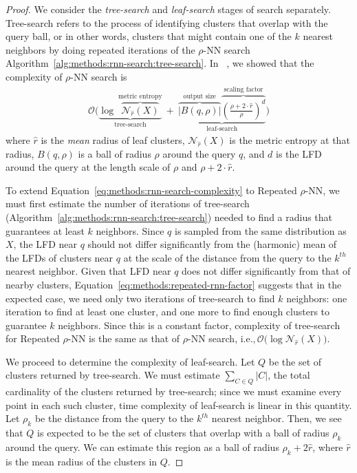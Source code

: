 \begin{proof} We consider the \textit{tree-search} and \textit{leaf-search} stages of search separately.
Tree-search refers to the process of identifying clusters that overlap with the query ball, or in other words, clusters that might contain one of the $k$ nearest neighbors by doing repeated iterations of the  $\rho$-NN search Algorithm~\ref{alg:methods:rnn-search:tree-search}.
In ~\cite{ishaq2019clustered}, we showed that the complexity of $\rho$-NN search is
\begin{gather}
    \mathcal{O}
    \Bigg(
        \underbrace{
            \log~\overbrace{\mathcal{N}_{\hat{r}}(X)}^{\textrm{metric entropy}}
        }_{\textrm{tree-search}}
        \ + \
        \underbrace{
            \overbrace{ \big| B(q, \rho) \big|}^{\textrm{output size}}
            \overbrace{ \left( \frac{\rho + 2 \cdot \hat{r}}{ \rho} \right) ^ d}^{\textrm{scaling factor}}
        }_{\textrm{leaf-search}}
    \Bigg)
    \label{eq:methods:rnn-search-complexity}
\end{gather}
where $\hat{r}$ is the \textit{mean} radius of leaf clusters, $\mathcal{N}_{\hat{r}}(X)$ is the metric entropy at that radius, $B(q, \rho)$ is a ball of radius $\rho$ around the query $q$, and $d$ is the LFD around the query at the length scale of $\rho$ and $\rho + 2 \cdot \hat{r}$.


To extend Equation~\ref{eq:methods:rnn-search-complexity} to Repeated $\rho$-NN, we must first estimate the number of iterations of tree-search (Algorithm~\ref{alg:methods:rnn-search:tree-search}) needed to find a radius that guarantees at least $k$ neighbors.
Since $q$ is sampled from the same distribution as $X$, the LFD near $q$ should not differ significantly from the (harmonic) mean of the LFDs of clusters near $q$ at the scale of the distance from the query to the $k^{th}$ nearest neighbor.
Given that LFD near $q$ does not differ significantly from that of nearby clusters, Equation~\ref{eq:methods:repeated-rnn-factor} suggests that in the expected case, we need only two iterations of tree-search to find $k$ neighbors:
one iteration to find at least one cluster, and one more to find enough clusters to guarantee $k$ neighbors.
Since this is a constant factor, complexity of tree-search for Repeated $\rho$-NN is the same as that of $\rho$-NN search, i.e.,\,$\mathcal{O}\big(\log\mathcal{N}_{\hat{r}}(X)\big)$.


We proceed to determine the complexity of leaf-search. Let $Q$ be the set of clusters returned by tree-search. We must estimate $\sum_{C \in Q} |C|$, the total cardinality of the clusters returned by tree-search; since we must examine every point in each such cluster, time complexity of leaf-search is linear in this quantity.
Let $\rho_k$ be the distance from the query to the $k^{th}$ nearest neighbor.
Then, we see that $Q$ is expected to be the set of clusters that overlap with a ball of radius $\rho_k$ around the query.
We can estimate this region as a ball of radius $\rho_k + 2\hat{r}$, where $\hat{r}$ is the mean radius of the clusters in $Q$.



\end{proof}
